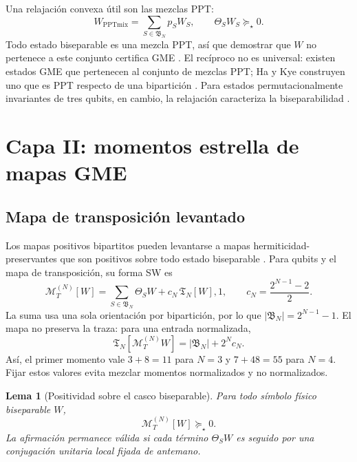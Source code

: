 \documentclass[11pt,a4paper]{article}
\newcommand{\Tfun}{\mathfrak T}
\newtheorem{lemma}[theorem]{Lema}
\theoremstyle{definition}
\begin{document}
Una relajación convexa útil son las mezclas PPT:
\begin{equation}
 W_{\mathrm{PPTmix}}=\sum_{S\in\mathfrak B_N}p_S W_S,
 \qquad \Theta_SW_S\succeq_\star0.
 \label{eq:pptmixture}
\end{equation}
Todo estado biseparable es una mezcla PPT, así que demostrar que $W$ no pertenece
a este conjunto certifica GME \cite{Jungnitsch2011PPTMixtures}. El recíproco no
es universal: existen estados GME que pertenecen al conjunto de mezclas PPT;
Ha y Kye construyen uno que es PPT respecto de una bipartición
\cite{HaKye2016PPTGME}. Para estados permutacionalmente invariantes de tres
qubits, en cambio, la relajación caracteriza la biseparabilidad
\cite{Novo2013PermInvariant}.

\section{Capa II: momentos estrella de mapas GME}

\subsection{Mapa de transposición levantado}

Los mapas positivos bipartitos pueden levantarse a mapas hermiticidad-preservantes
que son positivos sobre todo estado biseparable
\cite{HuberSengupta2014PositiveMaps,Clivaz2017GMEMaps}. Para qubits y el mapa de
transposición, su forma SW es
\begin{equation}
 \mathcal M_T^{(N)}[W]
 =\sum_{S\in\mathfrak B_N}\Theta_SW
 +c_N\,\Tfun_N[W],1,
 \qquad
 c_N=\frac{2^{N-1}-2}{2}.
 \label{eq:GME-map}
\end{equation}
La suma usa una sola orientación por bipartición, por lo que
$|\mathfrak B_N|=2^{N-1}-1$. El mapa no preserva la traza: para una entrada
normalizada,
\begin{equation}
 \Tfun_N[\mathcal M_T^{(N)}W]
 =|\mathfrak B_N|+2^Nc_N.
 \label{eq:map-trace}
\end{equation}
Así, el primer momento vale $3+8=11$ para $N=3$ y $7+48=55$ para $N=4$.
Fijar estos valores evita mezclar momentos normalizados y no normalizados.

\begin{lemma}[Positividad sobre el casco biseparable]
Para todo símbolo físico biseparable $W$,
\begin{equation}
 \mathcal M_T^{(N)}[W]\succeq_\star0.
 \label{eq:GME-map-positive}
\end{equation}
La afirmación permanece válida si cada término $\Theta_SW$ es seguido por una
conjugación unitaria local fijada de antemano.
\end{lemma}
\end{document}
